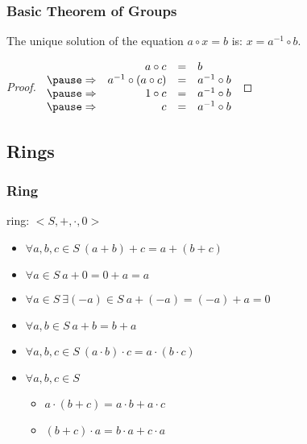 \documentclass[dvipsnames]{beamer}
\begin{document}
\begin{frame}
  \frametitle{Basic Theorem of Groups}

  \begin{theorem}
    The unique solution of the equation $a \circ x = b$ is: $x = a^{-1} \circ b$.
  \end{theorem}

  \pause
  \begin{proof}
    $\begin{array}{crcl}
                & a \circ c                & = & b\\\pause
    \Rightarrow & a^{-1} \circ (a \circ c) & = & a^{-1} \circ b\\\pause
    \Rightarrow & 1 \circ c                & = & a^{-1} \circ b\\\pause
    \Rightarrow & c                        & = & a^{-1} \circ b
    \end{array}$
  \end{proof}
\end{frame}

\subsection{Rings}

\begin{frame}
  \frametitle{Ring}

  \begin{definition}
    \alert{ring}: $<S,+,\cdot,0>$

    \begin{itemize}
      \item $\forall a,b,c \in S~(a + b) + c = a + (b + c)$
      \item $\forall a \in S~a + 0 = 0 + a = a$
      \item $\forall a \in S~\exists (-a) \in S~a + (-a) = (-a) + a = 0$
      \item $\forall a,b \in S~a + b = b + a$

      \pause
      \item $\forall a,b,c \in S~(a \cdot b) \cdot c = a \cdot (b \cdot c)$

      \pause
      \item $\forall a,b,c \in S$
      \begin{itemize}
        \item $a \cdot (b + c) = a \cdot b + a \cdot c$
        \item $(b + c) \cdot a = b \cdot a + c \cdot a$
      \end{itemize}
    \end{itemize}
  \end{definition}
\end{frame}
\end{document}
